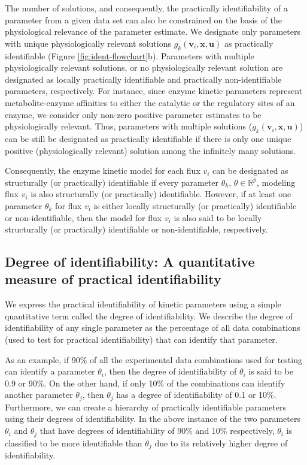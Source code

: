 \documentclass[10pt]{article}
\begin{document}
	The number of solutions, and consequently, the practically identifiability of a parameter from a given data set can also be constrained on the basis of the physiological relevance of the parameter estimate. We designate only parameters with unique physiologically relevant solutions $g_k(\mathbf{v}_i, \mathbf{x}, \mathbf{u})$ as practically identifiable (Figure \ref{fig:ident-flowchart}b). Parameters with multiple physiologically relevant solutions, or no physiologically relevant solution are designated as locally practically identifiable and practically non-identifiable parameters, respectively. For instance, since enzyme kinetic parameters represent metabolite-enzyme affinities to either the catalytic or the regulatory sites of an enzyme, we consider only non-zero positive parameter estimates to be physiologically relevant. Thus, parameters with multiple solutions ($g_k(\mathbf{v}_i, \mathbf{x}, \mathbf{u})$) can be still be designated as practically identifiable if there is only one unique positive (physiologically relevant) solution among the infinitely many solutions. 	
	
	Consequently, the enzyme kinetic model for each flux $v_i$ can be designated as structurally (or practically) identifiable if every parameter $\theta_k$, $\theta \in \mathbb{R}^{p}$, modeling flux $v_i$ is also structurally (or practically) identifiable. However, if at least one parameter $\theta_k$ for flux $v_i$ is either locally structurally (or practically) identifiable or non-identifiable, then the model for flux $v_i$ is also said to be locally structurally (or practically) identifiable or non-identifiable, respectively.	
	
	\subsection{Degree of identifiability: A quantitative measure of practical identifiability}\label{sec:degree_of_identifiability}
	We express the practical identifiability of kinetic parameters using a simple quantitative term called the degree of identifiability. We describe the degree of identifiability of any single parameter as the percentage of all data combinations (used to test for practical identifiability) that can identify that parameter. 
	
	As an example, if 90\% of all the experimental data combinations used for testing can identify a parameter $\theta_i$, then the degree of identifiability of $\theta_i$ is said to be 0.9 or 90\%. On the other hand, if only 10\% of the combinations can identify another parameter $\theta_j$, then $\theta_j$ has a degree of identifiability of 0.1 or 10\%. Furthermore, we can create a hierarchy of practically identifiable parameters using their degrees of identifiability. In the above instance of the two parameters $\theta_i$ and $\theta_j$ that have degrees of identifiability of 90\% and 10\% respectively, $\theta_i$ is classified to be more identifiable than $\theta_j$ due to its relatively higher degree of identifiability. 
	
\end{document}
